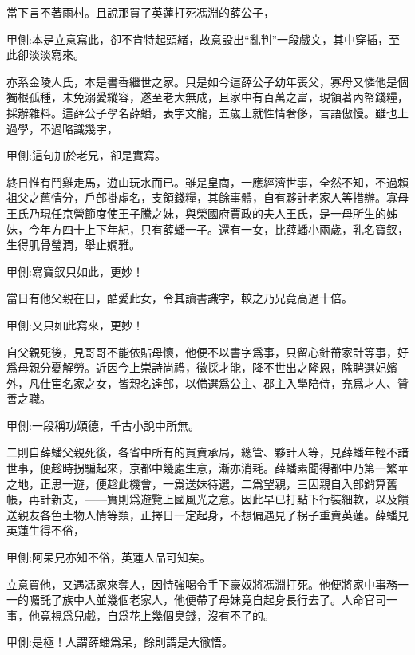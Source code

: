 \begin{parag}
    當下言不著雨村。且說那買了英蓮打死馮淵的薛公子，\begin{note}甲側:本是立意寫此，卻不肯特起頭緒，故意設出“亂判”一段戲文，其中穿插，至此卻淡淡寫來。\end{note}亦系金陵人氏，本是書香繼世之家。只是如今這薛公子幼年喪父，寡母又憐他是個獨根孤種，未免溺愛縱容，遂至老大無成，且家中有百萬之富，現領著內帑錢糧，採辦雜料。這薛公子學名薛蟠，表字文龍，五歲上就性情奢侈，言語傲慢。雖也上過學，不過略識幾字，\begin{note}甲側:這句加於老兄，卻是實寫。\end{note}終日惟有鬥雞走馬，遊山玩水而已。雖是皇商，一應經濟世事，全然不知，不過賴祖父之舊情分，戶部掛虛名，支領錢糧，其餘事體，自有夥計老家人等措辦。寡母王氏乃現任京營節度使王子騰之妹，與榮國府賈政的夫人王氏，是一母所生的姊妹，今年方四十上下年紀，只有薛蟠一子。還有一女，比薛蟠小兩歲，乳名寶釵，生得肌骨瑩潤，舉止嫺雅。\begin{note}甲側:寫寶釵只如此，更妙！\end{note}當日有他父親在日，酷愛此女，令其讀書識字，較之乃兄竟高過十倍。\begin{note}甲側:又只如此寫來，更妙！\end{note}自父親死後，見哥哥不能依貼母懷，他便不以書字爲事，只留心針黹家計等事，好爲母親分憂解勞。近因今上崇詩尚禮，徵採才能，降不世出之隆恩，除聘選妃嬪外，凡仕宦名家之女，皆親名達部，以備選爲公主、郡主入學陪侍，充爲才人、贊善之職。\begin{note}甲側:一段稱功頌德，千古小說中所無。\end{note}二則自薛蟠父親死後，各省中所有的買賣承局，總管、夥計人等，見薛蟠年輕不諳世事，便趁時拐騙起來，京都中幾處生意，漸亦消耗。薛蟠素聞得都中乃第一繁華之地，正思一遊，便趁此機會，一爲送妹待選，二爲望親，三因親自入部銷算舊帳，再計新支，——實則爲遊覽上國風光之意。因此早已打點下行裝細軟，以及饋送親友各色土物人情等類，正擇日一定起身，不想偏遇見了柺子重賣英蓮。薛蟠見英蓮生得不俗，\begin{note}甲側:阿呆兄亦知不俗，英蓮人品可知矣。\end{note}立意買他，又遇馮家來奪人，因恃強喝令手下豪奴將馮淵打死。他便將家中事務一一的囑託了族中人並幾個老家人，他便帶了母妹竟自起身長行去了。人命官司一事，他竟視爲兒戲，自爲花上幾個臭錢，沒有不了的。\begin{note}甲側:是極！人謂薛蟠爲呆，餘則謂是大徹悟。\end{note}
\end{parag}


